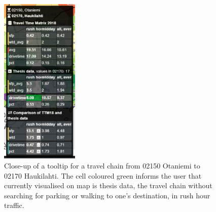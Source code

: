 \begin{figure}[H]%
    \centering
    \includegraphics[width=0.33\textwidth]{images/shinyapps_comparison_detail.png}
    \caption[Comparison application data]{Close-up of a tooltip for a travel chain from 02150 Otaniemi to 02170 Haukilahti. The cell coloured green informs the user that currently visualised on map is thesis data, the travel chain without searching for parking or walking to one's destination, in rush hour traffic.}%
    \label{fig:shinyapps_comparison_detail}%
\end{figure}